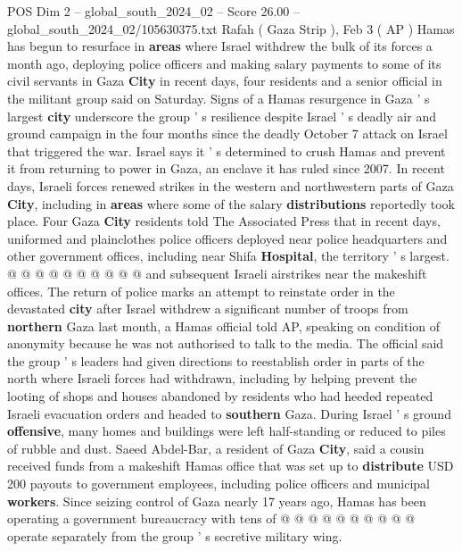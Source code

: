 \begin{textsample}{POS Dim 2 – global\_south\_2024\_02 – Score 26.00 – global\_south\_2024\_02/105630375.txt}  \label{ex:f2_pos_036}
Rafah ( Gaza Strip ), Feb 3 ( AP ) Hamas has begun to resurface in \textbf{areas} where Israel withdrew the bulk of its forces a month ago, deploying police officers and making salary payments to some of its civil servants in Gaza \textbf{City} in recent days, four residents and a senior official in the militant group said on Saturday.
Signs of a Hamas resurgence in Gaza ' s largest \textbf{city} underscore the group ' s resilience despite Israel ' s deadly air and ground campaign in the four months since the deadly October 7 attack on Israel that triggered the war.
Israel says it ' s determined to crush Hamas and prevent it from returning to power in Gaza, an enclave it has ruled since 2007.
In recent days, Israeli forces renewed strikes in the western and northwestern parts of Gaza \textbf{City}, including in \textbf{areas} where some of the salary \textbf{distributions} reportedly took place.
Four Gaza \textbf{City} residents told The Associated Press that in recent days, uniformed and plainclothes police officers deployed near police headquarters and other government offices, including near Shifa \textbf{Hospital}, the territory ' s largest. @ @ @ @ @ @ @ @ @ @ and subsequent Israeli airstrikes near the makeshift offices.
The return of police marks an attempt to reinstate order in the devastated \textbf{city} after Israel withdrew a significant number of troops from \textbf{northern} Gaza last month, a Hamas official told AP, speaking on condition of anonymity because he was not authorised to talk to the media.
The official said the group ' s leaders had given directions to reestablish order in parts of the north where Israeli forces had withdrawn, including by helping prevent the looting of shops and houses abandoned by residents who had heeded repeated Israeli evacuation orders and headed to \textbf{southern} Gaza.
During Israel ' s ground \textbf{offensive}, many homes and buildings were left half-standing or reduced to piles of rubble and dust.
Saeed Abdel-Bar, a resident of Gaza \textbf{City}, said a cousin received funds from a makeshift Hamas office that was set up to \textbf{distribute} USD 200 payouts to government employees, including police officers and municipal \textbf{workers}.
Since seizing control of Gaza nearly 17 years ago, Hamas has been operating a government bureaucracy with tens of @ @ @ @ @ @ @ @ @ @ operate separately from the group ' s secretive military wing.

\end{textsample}
